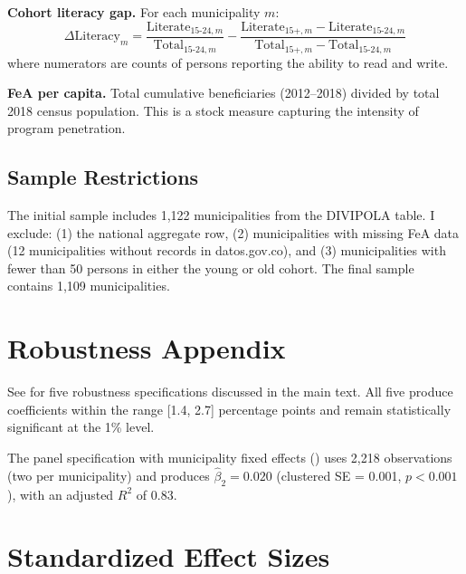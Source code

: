 \documentclass[12pt]{article}
\begin{document}
\textbf{Cohort literacy gap.} For each municipality $m$:
\[
\Delta \text{Literacy}_m = \frac{\text{Literate}_{15\text{-}24,m}}{\text{Total}_{15\text{-}24,m}} - \frac{\text{Literate}_{15+,m} - \text{Literate}_{15\text{-}24,m}}{\text{Total}_{15+,m} - \text{Total}_{15\text{-}24,m}}
\]
where numerators are counts of persons reporting the ability to read and write.

\textbf{FeA per capita.} Total cumulative beneficiaries (2012--2018) divided by total 2018 census population. This is a stock measure capturing the intensity of program penetration.

\subsection{Sample Restrictions}

The initial sample includes 1,122 municipalities from the DIVIPOLA table. I exclude: (1) the national aggregate row, (2) municipalities with missing FeA data (12 municipalities without records in datos.gov.co), and (3) municipalities with fewer than 50 persons in either the young or old cohort. The final sample contains 1,109 municipalities.

\section{Robustness Appendix}

See  for five robustness specifications discussed in the main text. All five produce coefficients within the range [1.4, 2.7] percentage points and remain statistically significant at the 1\% level.

The panel specification with municipality fixed effects () uses 2,218 observations (two per municipality) and produces $\hat{\beta}_2 = 0.020$ (clustered SE = 0.001, $p < 0.001$), with an adjusted $R^2$ of 0.83.

\section{Standardized Effect Sizes}
\label{sec:sde}


\end{document}
